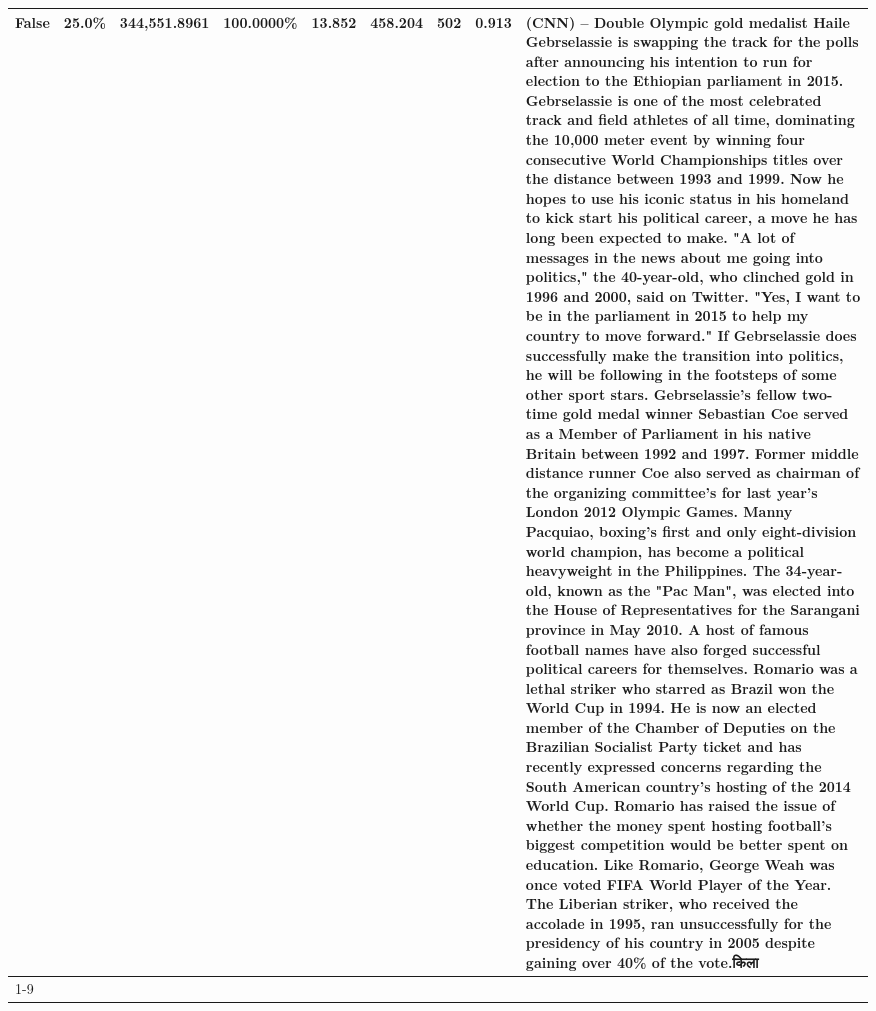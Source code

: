 \begin{table}[H]
{\begin{tabular}{lllrlllll}
False & 25.0\% & 344,551.8961 & \bfseries \color{red} 100.0000\% & 13.852 & 458.204 & 502 & 0.913 & (CNN) -- Double Olympic gold medalist Haile Gebrselassie is swapping the track for the polls after announcing his intention to run for election to the Ethiopian parliament in 2015. Gebrselassie is one of the most celebrated track and field athletes of all time, dominating the 10,000 meter event by winning four consecutive World Championships titles over the distance between 1993 and 1999. Now he hopes to use his iconic status in his homeland to kick start his political career, a move he has long been expected to make. "A lot of messages in the news about me going into politics," the 40-year-old, who clinched gold in 1996 and 2000, said on Twitter. "Yes, I want to be in the parliament in 2015 to help my country to move forward." If Gebrselassie does successfully make the transition into politics, he will be following in the footsteps of some other sport stars. Gebrselassie's fellow two-time gold medal winner Sebastian Coe served as a Member of Parliament in his native Britain between 1992 and 1997. Former middle distance runner Coe also served as chairman of the organizing committee's for last year's London 2012 Olympic Games. Manny Pacquiao, boxing's first and only eight-division world champion, has become a political heavyweight in the Philippines. The 34-year-old, known as the "Pac Man", was elected into the House of Representatives for the Sarangani province in May 2010. A host of famous football names have also forged successful political careers for themselves. Romario was a lethal striker who starred as Brazil won the World Cup in 1994. He is now an elected member of the Chamber of Deputies on the Brazilian Socialist Party ticket and has recently expressed concerns regarding the South American country's hosting of the 2014 World Cup. Romario has raised the issue of whether the money spent hosting football's biggest competition would be better spent on education. Like Romario, George Weah was once voted FIFA World Player of the Year. The Liberian striker, who received the accolade in 1995, ran unsuccessfully for the presidency of his country in 2005 despite gaining over 40\% of the vote.किला \\
\cline{1-9}

\end{tabular}}
\end{table}
